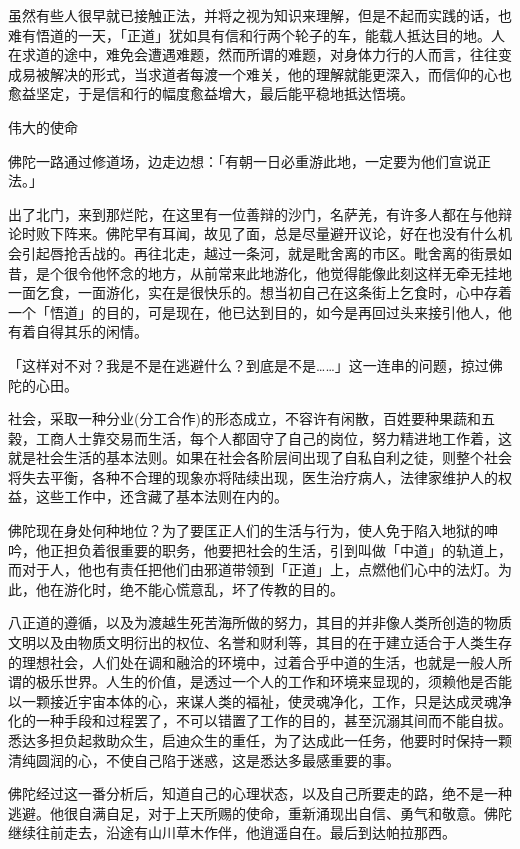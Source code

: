 \documentclass[12pt,twoside,openany]{book}
\begin{document}
虽然有些人很早就已接触正法，并将之视为知识来理解，但是不起而实践的话，也难有悟道的一天，「正道」犹如具有信和行两个轮子的车，能载人抵达目的地。人在求道的途中，难免会遭遇难题，然而所谓的难题，对身体力行的人而言，往往变成易被解决的形式，当求道者每渡一个难关，他的理解就能更深入，而信仰的心也愈益坚定，于是信和行的幅度愈益增大，最后能平稳地抵达悟境。

伟大的使命

佛陀一路通过修道场，边走边想：「有朝一日必重游此地，一定要为他们宣说正法。」

出了北门，来到那烂陀，在这里有一位善辩的沙门，名萨羌，有许多人都在与他辩论时败下阵来。佛陀早有耳闻，故见了面，总是尽量避开议论，好在也没有什么机会引起唇抢舌战的。再往北走，越过一条河，就是毗舍离的市区。毗舍离的街景如昔，是个很令他怀念的地方，从前常来此地游化，他觉得能像此刻这样无牵无挂地一面乞食，一面游化，实在是很快乐的。想当初自己在这条街上乞食时，心中存着一个「悟道」的目的，可是现在，他已达到目的，如今是再回过头来接引他人，他有着自得其乐的闲情。

「这样对不对？我是不是在逃避什么？到底是不是……」这一连串的问题，掠过佛陀的心田。

社会，采取一种分业(分工合作)的形态成立，不容许有闲散，百姓要种果蔬和五榖，工商人士靠交易而生活，每个人都固守了自己的岗位，努力精进地工作着，这就是社会生活的基本法则。如果在社会各阶层间出现了自私自利之徒，则整个社会将失去平衡，各种不合理的现象亦将陆续出现，医生治疗病人，法律家维护人的权益，这些工作中，还含藏了基本法则在内的。

佛陀现在身处何种地位？为了要匡正人们的生活与行为，使人免于陷入地狱的呻吟，他正担负着很重要的职务，他要把社会的生活，引到叫做「中道」的轨道上，而对于人，他也有责任把他们由邪道带领到「正道」上，点燃他们心中的法灯。为此，他在游化时，绝不能心慌意乱，坏了传教的目的。

八正道的遵循，以及为渡越生死苦海所做的努力，其目的并非像人类所创造的物质文明以及由物质文明衍出的权位、名誉和财利等，其目的在于建立适合于人类生存的理想社会，人们处在调和融洽的环境中，过着合乎中道的生活，也就是一般人所谓的极乐世界。人生的价值，是透过一个人的工作和环境来显现的，须赖他是否能以一颗接近宇宙本体的心，来谋人类的福祉，使灵魂净化，工作，只是达成灵魂净化的一种手段和过程罢了，不可以错置了工作的目的，甚至沉溺其间而不能自拔。悉达多担负起救助众生，启迪众生的重任，为了达成此一任务，他要时时保持一颗清纯圆润的心，不使自己陷于迷惑，这是悉达多最感重要的事。

佛陀经过这一番分析后，知道自己的心理状态，以及自己所要走的路，绝不是一种逃避。他很自满自足，对于上天所赐的使命，重新涌现出自信、勇气和敬意。佛陀继续往前走去，沿途有山川草木作伴，他逍遥自在。最后到达帕拉那西。
\end{document}
